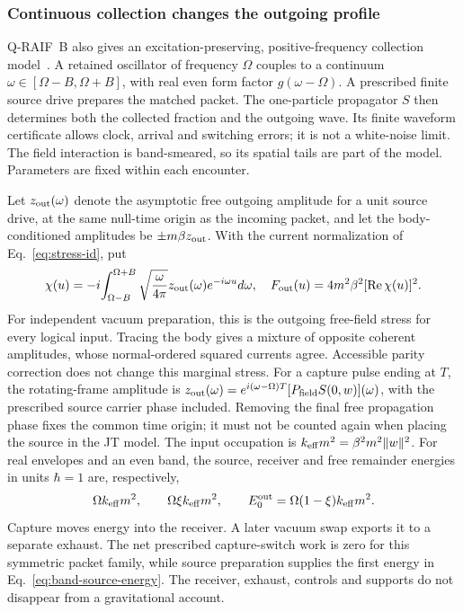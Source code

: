 \documentclass[12pt,a4paper]{article}
\begin{document}
\subsubsection{Continuous collection changes the outgoing profile}
\label{sec:band-source}

Q-RAIF~B also gives an excitation-preserving, positive-frequency collection
model~\cite{Liu2026QRAIFB}. A retained oscillator of frequency $\Omega$
couples to a continuum $\omega\in[\Omega-B,\Omega+B]$, with real even
form factor $g(\omega-\Omega)$. A prescribed finite source drive prepares
the matched packet. The one-particle propagator $S$ then determines both
the collected fraction and the outgoing wave. Its finite waveform certificate
allows clock, arrival and switching errors; it is not a white-noise limit.
The field interaction is band-smeared, so its spatial tails are part of the
model. Parameters are fixed within each encounter.

Let $z_{\rm out}(\omega)$ denote the asymptotic free outgoing amplitude for a
unit source drive, at the same null-time origin as the incoming packet,
and let the body-conditioned
amplitudes be $\pm m\beta z_{\rm out}$. With the current normalization of
Eq.~\eqref{eq:stress-id}, put
\begin{equation}
 \chi(u)=-i\!\int_{\Omega-B}^{\Omega+B}
 \sqrt{\frac{\omega}{4\pi}}z_{\rm out}(\omega)e^{-i\omega u}d\omega,
 \quad F_{\rm out}(u)=4m^2\beta^2[\operatorname{Re}\chi(u)]^2.
 \label{eq:band-out-stress}
\end{equation}
For independent vacuum preparation, this is the outgoing free-field stress
for every logical input. Tracing the body gives a mixture of opposite
coherent amplitudes, whose normal-ordered squared currents agree.
Accessible parity correction does not change this marginal stress.
For a capture pulse ending at $T$, the rotating-frame amplitude is
$z_{\rm out}(\omega)=e^{i(\omega-\Omega)T}
 [P_{\rm field}S(0,w)](\omega)$, with the prescribed source carrier phase
included. Removing the final free propagation phase fixes the common time
origin; it must not be counted again when placing the source in the JT model.
The input occupation is $k_{\rm eff}m^2=\beta^2m^2\|w\|^2$.
For real envelopes and an even band, the source, receiver and free remainder
energies in units $\hbar=1$ are, respectively,
\begin{equation}
 \Omega k_{\rm eff}m^2,\qquad
 \Omega\xi k_{\rm eff}m^2,\qquad
 E_0^{\rm out}=\Omega(1-\xi)k_{\rm eff}m^2.
 \label{eq:band-source-energy}
\end{equation}
Capture moves energy into the receiver. A later vacuum swap exports it to
a separate exhaust. The net prescribed capture-switch work is zero for
this symmetric packet family, while source preparation supplies the first
energy in Eq.~\eqref{eq:band-source-energy}. The receiver, exhaust, controls
and supports do not disappear from a gravitational account.
\end{document}
